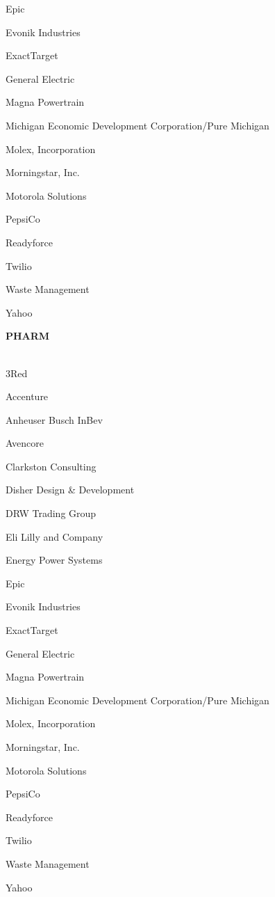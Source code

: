 \documentclass[twoside]{article}
\begin{document}
\begin{center}
\begin{multicols}{5}
\begin{FlushLeft}
\begin{compactitem}
\item Epic
\item Evonik Industries
\item ExactTarget
\item General Electric
\item Magna Powertrain
\item Michigan Economic Development Corporation/Pure Michigan
\item Molex, Incorporation
\item Morningstar, Inc.
\item Motorola Solutions
\item PepsiCo
\item Readyforce
\item Twilio
\item Waste Management
\item Yahoo
\end{compactitem}
        \end{FlushLeft}
        \vspace{1em}
        {\fontsize{14}{16}\selectfont \bf PHARM}\\
        \vspace{-1em}
        ~\hrulefill~
        \vspace{-.9em}
        \begin{FlushLeft}
        \begin{compactitem}
        \item 3Red
\item Accenture
\item Anheuser Busch InBev
\item Avencore
\item Clarkston Consulting
\item Disher Design \& Development
\item DRW Trading Group
\item Eli Lilly and Company
\item Energy Power Systems
\item Epic
\item Evonik Industries
\item ExactTarget
\item General Electric
\item Magna Powertrain
\item Michigan Economic Development Corporation/Pure Michigan
\item Molex, Incorporation
\item Morningstar, Inc.
\item Motorola Solutions
\item PepsiCo
\item Readyforce
\item Twilio
\item Waste Management
\item Yahoo
\end{compactitem}
        \end{FlushLeft}
        \vspace{1em}
        \end{multicols}\end{center}
\end{document}
